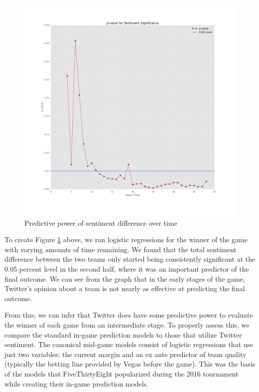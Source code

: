 \documentclass[12pt]{article}
\begin{document}
\begin{doublespacing}
\begin{figure} [H]
	\centering
	\includegraphics[scale = 0.4] {Images/pValuePlot.png} 
	\caption{Predictive power of sentiment difference over time}\label{fig:significance}
\end{figure}

To create Figure \ref{fig:significance} above, we ran logistic regressions for the winner of the game with varying amounts of time remaining. We found that the total sentiment difference between the two teams only started being consistently significant at the 0.05 percent level in the second half, where it was an important predictor of the final outcome. We can see from the graph that in the early stages of the game, Twitter's opinion about a team is not nearly as effective at predicting the final outcome. 

From this, we can infer that Twitter does have some predictive power to evaluate the winner of each game from an intermediate stage. To properly assess this, we compare the standard in-game prediction models to those that utilize Twitter sentiment. The canonical mid-game models consist of logistic regressions that use just two variables: the current margin and an ex ante predictor of team quality (typically the betting line provided by Vegas before the game). This was the basis of the models that FiveThirtyEight popularized during the 2016 tournament while creating their in-game prediction models. 


\end{doublespacing}
\end{document}
